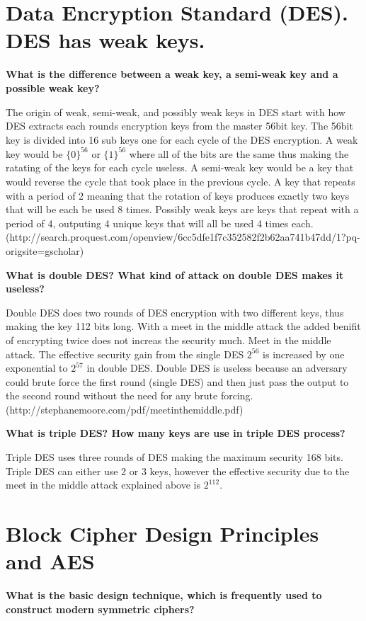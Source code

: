 \documentclass[letterpaper,11pt,notitlepage,fleqn]{article}
\begin{document}
\section{Data Encryption Standard (DES). DES has weak keys.}
\noindent \textbf{What is the difference between a weak key, a semi-weak key and a possible weak key?}

The origin of weak, semi-weak, and possibly weak keys in DES start with how DES extracts each rounds encryption keys from the master 56bit key. The 56bit key is divided into 16 sub keys one for each cycle of the DES encryption. A weak key would be $\lbrace0\rbrace^{56}$ or $\lbrace1\rbrace^{56}$ where all of the bits are the same thus making the ratating of the keys for each cycle useless. A semi-weak key would be a key that would reverse the cycle that took place in the previous cycle. A
key that repeats with a period of 2 meaning that the rotation of keys produces exactly two keys that will be each be used 8 times. Possibly weak keys are keys that repeat with a period of 4, outputing 4 unique keys that will all be used 4 times each. (http://search.proquest.com/openview/6cc5dfe1f7c352582f2b62aa741b47dd/1?pq-origsite=gscholar) 

\noindent \textbf{What is double DES?  What kind of attack on double DES makes it useless?}

Double DES does two rounds of DES encryption with two different keys, thus making the key 112 bits long. With a meet in the middle attack the added benifit of encrypting twice does not increas the security much. 
Meet in the middle attack. The effective security gain from the single DES $2^{56}$ is increased by one exponential to $2^{57}$ in double DES. Double DES is useless because an adversary could brute force the first round (single DES) and then just pass the output to the second round without the need for any brute forcing. (http://stephanemoore.com/pdf/meetinthemiddle.pdf)

\noindent \textbf{What is triple DES?  How many keys are use in triple DES process?}

Triple DES uses three rounds of DES making the maximum security 168 bits. Triple DES can either use 2 or 3 keys, however the effective security due to the meet in the middle attack explained above is $2^{112}$. 



\section{Block Cipher Design Principles and AES}
\noindent \textbf{What is the basic design  technique,  which  is  frequently  used  to  construct  modern symmetric ciphers?}
\end{document}
